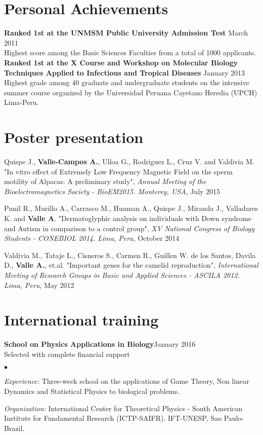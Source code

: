 \documentclass[margin,line]{res}
\newenvironment{list2}{
  \begin{list}{$\bullet$}{%
      \setlength{\itemsep}{0in}
      \setlength{\parsep}{0in} \setlength{\parskip}{0in}
      \setlength{\topsep}{0in} \setlength{\partopsep}{0in}
      \setlength{\leftmargin}{0.2in}}}{\end{list}}
\begin{document}
\begin{resume}
\section{\sc Personal Achievements}
{\bf Ranked 1st at the UNMSM Public University Admission Test} \hfill March 2011\\
Highest score among the Basic Sciences Faculties from a total of 1000 applicants.\vspace*{.05in}\\
{\bf Ranked 1st at the X Course and Workshop on Molecular Biology \\Techniques Applied to Infectious and Tropical Diseases} \hfill January 2013\\
Highest grade among 40 graduate and undergraduate students on the intensive summer course organized by the Universidad Peruana Cayetano Heredia (UPCH) Lima-Peru.\\

\newpage
\section{\sc Poster presentation}

Quispe J., \textbf{Valle-Campos A.}, Ulloa G., Rodriguez L., Cruz V. and Valdivia M. "In vitro effect of Extremely Low Frequency Magnetic Field on the sperm motility of Alpacas: A preliminary study", {\em Annual Meeting of the Bioelectromagnetics Society - BioEM2015. Monterey, USA}, July 2015

Punil R., Murillo A., Carrasco M., Huaman A., Quispe J., Miranda J., Valladares K. and \textbf{Valle A}. "Dermatoglyphic analysis on individuals with Down syndrome and Autism in comparison to a control group", {\em XV National Congress of Biology Students - CONEBIOL 2014. Lima, Peru}, October 2014

Valdivia M., Tataje L., Cisneros S., Carmen R., Guillen W. de los Santos, Davila D., \textbf{Valle A.}, et.al. "Important genes for the camelid reproduction", {\em International Meeting of Research Groups in Basic and Applied Sciences - ASCILA 2012. Lima, Peru}, May 2012\\

\section{\sc International training}
{\bf School on Physics Applications in Biology}\hfill {January 2016}\\
Selected with complete financial support
\begin{list2} %
	\item \textit{Experience:} Three-week school on the applications of Game Theory, Non linear Dynamics and Statistical Physics to biological problems.
	\item \textit{Organization:} International Center for Theoretical Physics - South American Institute for Fundamental Research (ICTP-SAIFR). IFT-UNESP, Sao Paulo- Brazil.
\end{list2}


\end{resume}
\end{document}

